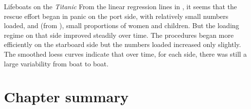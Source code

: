 \documentclass[10pt,krantz2]{krantz}\usepackage[]{graphicx}\usepackage[]{color}
\newenvironment{knitrout}{}{} %
\renewenvironment{knitrout}{\small\renewcommand{\baselinestretch}{.85}}{} %
\begin{document}
\begin{Example}[lifeboat1]{Lifeboats on the \emph{Titanic}}
\begin{knitrout}
\end{knitrout}
From the linear regression lines in ,
it seems that the rescue effort began in panic on the port side,
with relatively small numbers loaded, and (from ),
small proportions of women and children.
But the loading regime on that side improved steadily over time.
The procedures began more efficiently on the starboard side
but the numbers loaded increased only slightly.
The smoothed loess curves indicate that over time, for each side,
there was still a large variability from boat to boat.

\end{Example}


\section{Chapter summary}\label{sec:twoway-summary}
\end{document}
